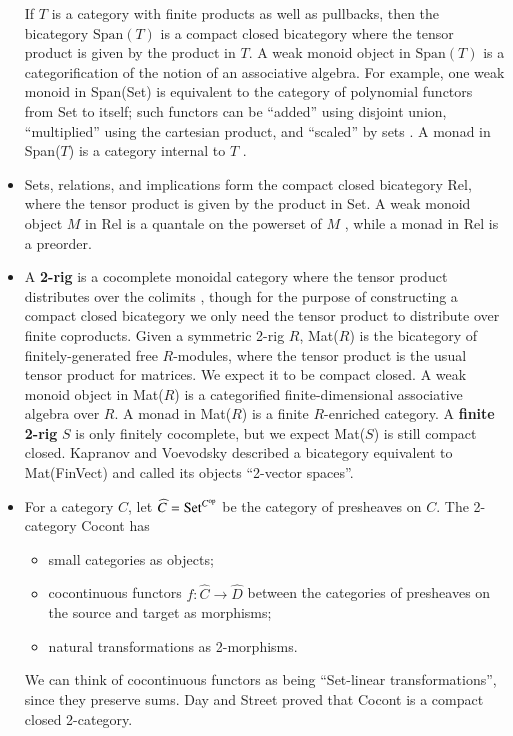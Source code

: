 \documentclass{article}
\newcommand{\Set}{\mathrm{Set}}
\newcommand{\op}{{\rm op}}
\newcommand{\Span}{\mbox{Span}}
\begin{document}
\begin{itemize}
  If $T$ is a category with finite products as well as pullbacks, then the bicategory $\Span(T)$ is a compact closed bicategory where the tensor product is given by the product in $T.$  A weak monoid object in $\Span(T)$ is a categorification of the notion of an associative algebra.  For example, one weak monoid in Span(Set) is equivalent to the category of polynomial functors from Set to itself; such functors can be ``added'' using disjoint union, ``multiplied'' using the cartesian product, and ``scaled'' by sets \cite{GK}.  A monad in Span($T$) is a category internal to $T$ \cite{Ben67}.
  
  \item Sets, relations, and implications form the compact closed bicategory Rel, where the tensor product is given by the product in Set.  A weak monoid object $M$ in Rel is a quantale on the powerset of $M$ \cite{ShulCafe}, while a monad in Rel is a preorder.

  \item A {\bf 2-rig} is a cocomplete monoidal category where the tensor product distributes over the colimits \cite{HDA3}, though for the purpose of constructing a compact closed bicategory we only need the tensor product to distribute over finite coproducts.  Given a symmetric 2-rig $R$, Mat($R$) is the bicategory of finitely-generated free $R$-modules, where the tensor product is the usual tensor product for matrices.  We expect it to be compact closed.  A weak monoid object in Mat($R$) is a categorified finite-dimensional associative algebra over $R.$  A monad in Mat($R$) is a finite $R$-enriched category.  A {\bf finite 2-rig} $S$ is only finitely cocomplete, but we expect Mat($S$) is still compact closed. Kapranov and Voevodsky \cite{KV94} described a bicategory equivalent to Mat(FinVect) and called its objects ``2-vector spaces''.

  \item For a category $C$, let $\widehat{C} = \Set^{C^{\op}}$ be the category of presheaves on $C$.  The 2-category Cocont has
    \begin{itemize}
      \item small categories as objects;
      \item cocontinuous functors $f:\widehat{C} \to \widehat{D}$ between the categories of presheaves on the source and target as morphisms;
      \item natural transformations as 2-morphisms.
    \end{itemize}
    We can think of cocontinuous functors as being ``Set-linear transformations'', since they preserve sums.  Day and Street \cite{DS97}
proved that Cocont is a compact closed 2-category.


\end{itemize}
\end{document}
